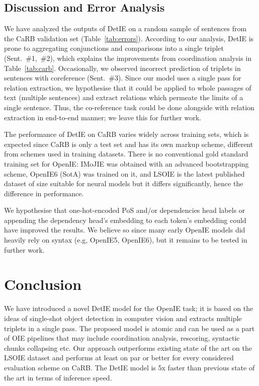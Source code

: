 \documentclass[letterpaper]{article} \usepackage{aaai22}  \usepackage{times}  \usepackage{helvet}  \usepackage{courier}  \usepackage[hyphens]{url}  \usepackage{graphicx} \usepackage{placeins}
\begin{document}
\subsection{Discussion and Error Analysis}\label{ssec:discussion}

We have analyzed the outputs of DetIE on a random sample of  sentences from the CaRB validation set (Table~\ref{tab:errors}). According to our analysis, DetIE is prone to aggregating conjunctions and comparisons into a single triplet (Sent.~\#1,~\#2), which explains the improvements from coordination analysis in Table~\ref{tab:carb}. Occasionally, we observed incorrect prediction of triplets in sentences with coreference (Sent.~\#3).
Since our model uses a single pass for relation extraction, we hypothesise that it could be applied to whole passages of text (multiple sentences) and extract relations which permeate the limits of a single sentence. Thus, the co-reference task could be done alongside with relation extraction in end-to-end manner; we leave this for further work.

The performance of DetIE on CaRB varies widely across training sets, which is expected since CaRB is only a test set and has its own markup scheme, different from schemes used in training datasets. There is no conventional gold standard training set for OpenIE: IMoJIE was obtained with an advanced bootstrapping scheme, OpenIE6 (SotA) was trained on it, and LSOIE is the latest published dataset of size suitable for neural models but it differs significantly, hence the difference in performance.

We hypothesise that one-hot-encoded PoS and/or dependencies head labels or appending the dependency head’s embedding to each token’s embedding could have improved the results. We believe so since many early OpenIE models did heavily rely on syntax (e.g, OpenIE5, OpenIE6), but it remains to be tested in further work.

\section{Conclusion}\label{sec:conclusion}

We have introduced a novel DetIE model for the OpenIE task; it is based on the ideas of single-shot object detection in computer vision and extracts multiple triplets in a single pass. The proposed model is atomic and can be used as a part of OIE pipelines that may include coordination analysis, rescoring, syntactic chunks collapsing etc. Our approach outperforms existing state of the art on the LSOIE dataset and performs at least on par or better for every considered evaluation scheme on CaRB.
The DetIE model is 5x faster than previous state of the art in terms of inference speed.
\end{document}
